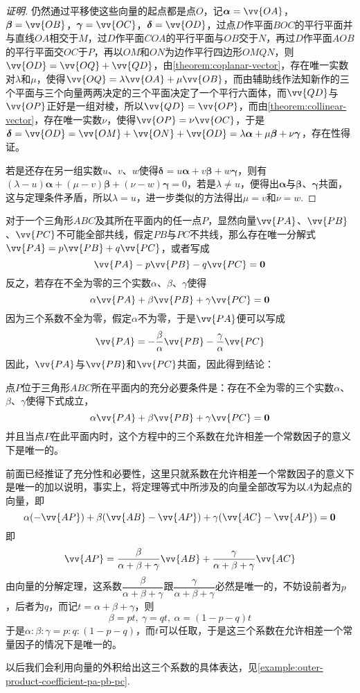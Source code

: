 \begin{proof}[证明]
  仍然通过平移使这些向量的起点都是点$O$，记$\bm{\alpha}=\vv{OA}$，$\bm{\beta}=\vv{OB}$，$\bm{\gamma}=\vv{OC}$，$\bm{\delta}=\vv{OD}$，过点$D$作平面$BOC$的平行平面并与直线$OA$相交于$M$，过$D$作平面$COA$的平行平面与$OB$交于$N$，再过$D$作平面$AOB$的平行平面交$OC$于$P$，再以$OM$和$ON$为边作平行四边形$OMQN$，则$\vv{OD}=\vv{OQ}+\vv{QD}$，由\autoref{theorem:coplanar-vector}，存在唯一实数对$\lambda$和$\mu$，使得$\vv{OQ}=\lambda \vv{OA} + \mu \vv{OB}$，而由辅助线作法知新作的三个平面与三个向量两两决定的三个平面决定了一个平行六面体，而$\vv{QD}$与$\vv{OP}$正好是一组对棱，所以$\vv{QD}=\vv{OP}$，而由\autoref{theorem:collinear-vector}，存在唯一实数$\nu$，使得$\vv{OP}=\nu \vv{OC}$，于是$\bm{\delta} = \vv{OD} = \vv{OM}+\vv{ON}+\vv{OD}=\lambda \bm{\alpha} + \mu \bm{\beta} + \nu \bm{\gamma}$，存在性得证。

  若是还存在另一组实数$u$、$v$、$w$使得$\bm{\delta} = u \bm{\alpha} + v \bm{\beta} + w \bm{\gamma}$，则有$(\lambda-u)\bm{\alpha}+(\mu-v)\bm{\beta}+(\nu-w)\bm{\gamma}=0$，若是$\lambda \neq u$，便得出$\bm{\alpha}$与$\bm{\beta}$、$\bm{\gamma}$共面，这与定理条件矛盾，所以$\lambda = u$，进一步类似的方法得出$\mu =v$和$\nu=w$.
\end{proof}

\begin{example}
  \label{example:point-p-locate-plane-of-triangle-abc}
    对于一个三角形$ABC$及其所在平面内的任一点$P$，显然向量$\vv{PA}$、$\vv{PB}$、$\vv{PC}$不可能全部共线，假定$PB$与$PC$不共线，那么存在唯一分解式$\vv{PA}=p\vv{PB}+q\vv{PC}$，或者写成
  \[ \vv{PA}-p\vv{PB}-q\vv{PC}=\bm{0} \]
  反之，若存在不全为零的三个实数$\alpha$、$\beta$、$\gamma$使得
  \[ \alpha \vv{PA} + \beta \vv{PB} + \gamma \vv{PC} = \bm{0} \]
  因为三个系数不全为零，假定$\alpha$不为零，于是$\vv{PA}$便可以写成
  \[ \vv{PA} = -\frac{\beta}{\alpha} \vv{PB} - \frac{\gamma}{\alpha} \vv{PC} \]
  因此，$\vv{PA}$与$\vv{PB}$和$\vv{PC}$共面，因此得到结论：
  \begin{theorem}
    点$P$位于三角形$ABC$所在平面内的充分必要条件是：存在不全为零的三个实数$\alpha$、$\beta$、$\gamma$使得下式成立，
    \[ \alpha \vv{PA} + \beta \vv{PB} + \gamma \vv{PC} = \bm{0} \]
    并且当点$P$在此平面内时，这个方程中的三个系数在允许相差一个常数因子的意义下是唯一的。
  \end{theorem}
  前面已经推证了充分性和必要性，这里只就系数在允许相差一个常数因子的意义下是唯一的加以说明，事实上，将定理等式中所涉及的向量全部改写为以$A$为起点的向量，即
  \[ \alpha (-\vv{AP}) + \beta (\vv{AB}-\vv{AP}) + \gamma (\vv{AC}-\vv{AP}) = \bm{0} \]
  即
  \[ \vv{AP} = \frac{\beta}{\alpha+\beta+\gamma} \vv{AB} + \frac{\gamma}{\alpha+\beta+\gamma} \vv{AC} \]
  由向量的分解定理，这系数$\dfrac{\beta}{\alpha+\beta+\gamma}$跟$\dfrac{\gamma}{\alpha+\beta+\gamma}$必然是唯一的，不妨设前者为$p$，后者为$q$，而记$t=\alpha+\beta+\gamma$，则
  \[ \beta=pt, \  \gamma=qt, \  \alpha=(1-p-q)t \]
  于是$\alpha:\beta:\gamma=p:q:(1-p-q)$，而$t$可以任取，于是这三个系数在允许相差一个常量因子的情况下是唯一的。

以后我们会利用向量的外积给出这三个系数的具体表达，见\autoref{example:outer-product-coefficient-pa-pb-pc}.
\end{example}

